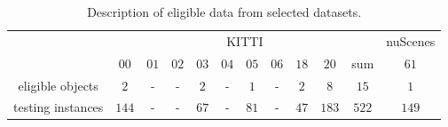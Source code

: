 \begin{table}[t]
\footnotesize
\centering
\setlength{\tabcolsep}{2.8pt}
\caption{\small{Description of eligible data from selected datasets.}}
\label{tab:data_source}
\begin{tabular}{c|ccccccccc|c|c}
\toprule
 & \multicolumn{10}{c|}{KITTI} & \multicolumn{1}{c}{nuScenes}\\
 & $00$ & $01$ & $02$ & $03$ & $04$ & $05$ & $06$ & $18$ & $20$ & sum & $61$ \\
\midrule
\midrule
 eligible objects & $2$ & - & - & $2$ & - & $1$ & - & $2$ & $8$ & $15$ & $1$ \\
 \midrule
 testing instances & $144$ & - & - & $67$ & - & $81$ & - & $47$ & $183$ & $522$ & $149$ \\
\bottomrule
\end{tabular}
\vspace{-4mm}
\end{table}
